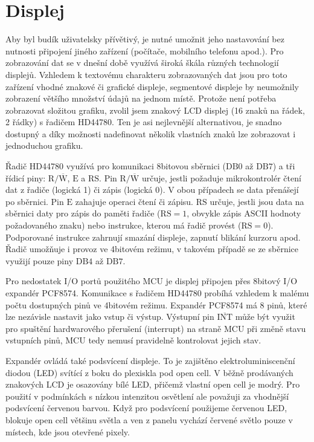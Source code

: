 \section{Displej}
Aby byl budík uživatelsky přívětivý, je nutné umožnit jeho nastavování bez
nutnosti připojení jiného zařízení (počítače, mobilního telefonu apod.).
Pro zobrazování dat se v dnešní době využívá široká škála různých technologií
displejů. Vzhledem k textovému charakteru zobrazovaných dat jsou pro toto
zařízení vhodné znakové či grafické displeje, segmentové displeje by neumožnily
zobrazení většího množství údajů na jednom místě. Protože není potřeba
zobrazovat složitou grafiku, zvolil jsem znakový LCD displej (16 znaků na
řádek, 2 řádky) s řadičem HD44780. Ten je asi nejlevnější alternativou, je
snadno dostupný a díky možnosti nadefinovat několik vlastních znaků lze
zobrazovat i jednoduchou grafiku.

Řadič HD44780 využívá pro komunikaci 8bitovou sběrnici ($\mathrm{DB0}$ až
$\mathrm{DB7}$) a tři řídicí piny: $\mathrm{R}/\overline{\mathrm{W}}$,
$\mathrm{E}$ a $\mathrm{RS}$. Pin $\mathrm{R}/\overline{\mathrm{W}}$ určuje,
jestli požaduje mikrokontrolér čtení dat z řadiče (logická 1) či zápis (logická
0). V obou případech se data přenášejí po sběrnici. Pin $\mathrm{E}$ zahajuje
operaci čtení či zápisu. $\mathrm{RS}$ určuje, jestli jsou data na sběrnici
daty pro zápis do paměti řadiče ($\mathrm{RS} = 1$, obvykle zápis ASCII hodnoty
požadovaného znaku) nebo instrukce, kterou má řadič provést ($\mathrm{RS} =
0$). Podporované instrukce zahrnují smazání displeje, zapnutí blikání kurzoru
apod. Řadič umožňuje i provoz ve 4bitovém režimu, v takovém případě se ze
sběrnice využijí pouze piny $\mathrm{DB4}$ až $\mathrm{DB7}$.~\cite{dshHD44780}

Pro nedostatek I/O portů použitého MCU je displej připojen přes
8bitový \IIC{} I/O expandér PCF8574. Komunikace s řadičem
HD44780 probíhá vzhledem k malému počtu dostupných pinů ve 4bitovém režimu.
Expandér PCF8574 má 8 pinů, které lze nezávisle nastavit jako vstup či výstup.
Výstupní pin $\overline{\mathrm{INT}}$ může být využit pro spuštění
hardwarového přerušení (interrupt) na straně MCU při změně stavu vstupních
pinů, MCU tedy nemusí pravidelně kontrolovat jejich stav.~\cite{dshPCF8574}



Expandér ovládá také podsvícení displeje. To je zajištěno elektroluminiscenční
diodou (LED) svítící z boku do plexiskla pod open cell. V běžně prodávaných
znakových LCD je osazovány bílé LED, přičemž vlastní open cell je modrý. Pro
použití v podmínkách s nízkou intenzitou osvětlení ale považuji za vhodnější
podsvícení červenou barvou. 
Když pro podsvícení použijeme červenou LED, blokuje
open cell 
většinu světla a ven z panelu vychází červené světlo pouze v místech, kde jsou
otevřené pixely.

